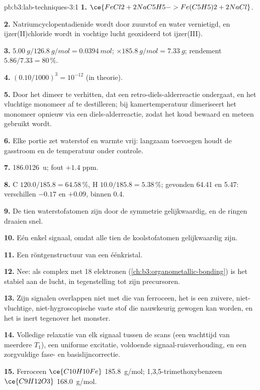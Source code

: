 \begin{solution}{pb:b3:lab-techniques-3:1}
\textbf{1.} $\ce{FeCl2 + 2NaC5H5 -> Fe(C5H5)2 + 2NaCl}$.

\textbf{2.} Natriumcyclopentadienide wordt door zuurstof en water
vernietigd, en ijzer(II)chloride wordt in vochtige lucht geoxideerd tot
ijzer(III).

\textbf{3.} $\qty{5.00}{g}/\qty{126.8}{g/mol} = \qty{0.0394}{mol}$; $\times \qty{185.8}{g/mol} = \qty{7.33}{g}$; rendement $5.86/7.33 = 80$\,\%.

\textbf{4.} $(0.10/1000)^3 = 10^{-12}$ (in theorie).

\textbf{5.} Door het dimeer te verhitten, dat een retro-diels-alderreactie
ondergaat, en het vluchtige monomeer af te destilleren; bij
kamertemperatuur dimeriseert het monomeer opnieuw via een
diels-alderreactie, zodat het koud bewaard en meteen gebruikt wordt.

\textbf{6.} Elke portie zet waterstof en warmte vrij: langzaam toevoegen
houdt de gasstroom en de temperatuur onder controle.

\textbf{7.} \qty{186.0126}{u}; fout $+1.4$ ppm.

\textbf{8.} C $120.0/185.8 = 64.58$\,\%, H $10.0/185.8 = 5.38$\,\%; gevonden 64.41 en 5.47: verschillen $-0.17$ en $+0.09$, binnen 0.4.

\textbf{9.} De tien waterstofatomen zijn door de symmetrie gelijkwaardig,
en de ringen draaien snel.

\textbf{10.} Eén enkel signaal, omdat alle tien de koolstofatomen
gelijkwaardig zijn.

\textbf{11.} Een röntgenstructuur van een éénkristal.

\textbf{12.} Nee: als complex met 18 elektronen (\cref{ch:b3:organometallic-bonding}) is het stabiel aan de lucht, in
tegenstelling tot zijn precursoren.

\textbf{13.} Zijn signalen overlappen niet met die van ferroceen, het is
een zuivere, niet-vluchtige, niet-hygroscopische vaste stof die
nauwkeurig gewogen kan worden, en het is inert tegenover het monster.

\textbf{14.} Volledige relaxatie van elk signaal tussen de scans (een
wachttijd van meerdere $T_1$), een uniforme excitatie, voldoende
signaal-ruisverhouding, en een zorgvuldige fase- en basislijncorrectie.

\textbf{15.} Ferroceen $\ce{C10H10Fe}$ \qty{185.8}{g/mol}; 1,3,5-trimethoxybenzeen $\ce{C9H12O3}$ \qty{168.0}{g/mol}.


\end{solution}
